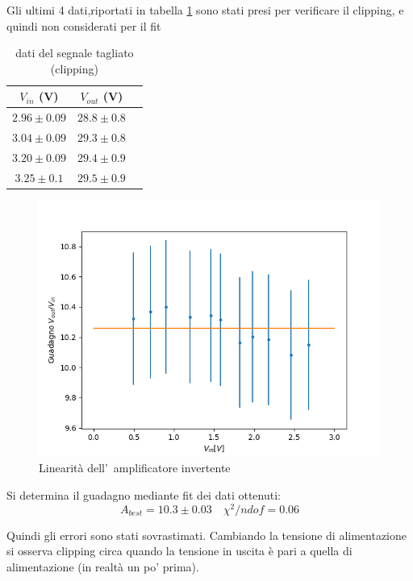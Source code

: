 \documentclass[10pt,a4paper]{article}
\begin{document}
		Gli ultimi 4 dati,riportati in tabella \ref{tab:daticlipping} sono stati presi per verificare il clipping, e quindi non considerati per il fit
		\begin{table}[h]
	
			\begin{center}
				\begin{tabular}{|c|c|c|}
					\hline
					$V_{in}$ (V) & $V_{out}$ (V)   \\
		\hline
		$2.96 \pm 0.09 $ & $28.8 \pm 0.8 $ \\
		\hline
		$3.04 \pm 0.09 $ & $29.3 \pm 0.8  $ \\
		\hline
		$3.20 \pm 0.09 $ & $29.4 \pm 0.9  $ \\
		\hline
		$3.25 \pm 0.1 $ & $29.5 \pm 0.9 $ \\
		\hline
		\end{tabular}
	\end{center}
\label{tab:daticlipping}
\caption{dati del segnale tagliato (clipping)}
\end{table}

	\begin{figure}\centering
			\includegraphics[scale=0.5]{fit.png}
				\caption{\small Linearit\`a dell'~amplificatore invertente}
			\label{fit}
	\end{figure}

	
	Si determina il guadagno mediante fit dei dati ottenuti:
	\[
	A_{best} = 10.3 \pm 0.03 \quad  \chi^2/ndof = 0.06
	\]

	Quindi gli errori sono stati sovrastimati.
	Cambiando la tensione di alimentazione si osserva clipping circa quando la tensione in uscita è pari a quella di alimentazione (in realtà un po' prima).
	
\end{document}
